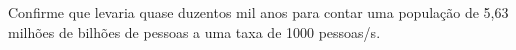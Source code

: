 Confirme que levaria quase duzentos mil anos para contar uma população de 5,63 milhões de bilhões de pessoas a uma taxa de 1000 pessoas/s.

